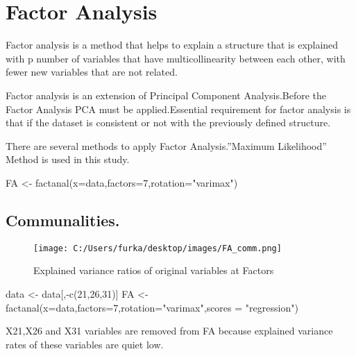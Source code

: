 \documentclass[12pt,twoside]{deuthesis}
\newenvironment{Shaded}{\begin{snugshade}}{\end{snugshade}}
\newcommand{\AttributeTok}[1]{\textcolor[rgb]{0.77,0.63,0.00}{#1}}
\newcommand{\DecValTok}[1]{\textcolor[rgb]{0.00,0.00,0.81}{#1}}
\newcommand{\FunctionTok}[1]{\textcolor[rgb]{0.00,0.00,0.00}{#1}}
\newcommand{\NormalTok}[1]{#1}
\newcommand{\OtherTok}[1]{\textcolor[rgb]{0.56,0.35,0.01}{#1}}
\newcommand{\SpecialCharTok}[1]{\textcolor[rgb]{0.00,0.00,0.00}{#1}}
\newcommand{\StringTok}[1]{\textcolor[rgb]{0.31,0.60,0.02}{#1}}
\begin{document}
\hypertarget{factor-analysis}{%
\section{Factor Analysis}\label{factor-analysis}}

Factor analysis is a method that helps to explain a structure that is explained with p number of variables that have multicollinearity between each other, with fewer new variables that are not related.\\

\setlength{\parindent}{0in}

Factor analysis is an extension of Principal Component Analysis.Before the Factor Analysis PCA must be applied.Essential requirement for factor analysis is that if the dataset is consistent or not with the previously defined structure.

\setlength{\parindent}{0in}

There are several methods to apply Factor Analysis.''Maximum Likelihood'' Method is used in this study.
\begin{Shaded}
\begin{Highlighting}[]
\NormalTok{FA }\OtherTok{\textless{}{-}} \FunctionTok{factanal}\NormalTok{(}\AttributeTok{x=}\NormalTok{data,}\AttributeTok{factors=}\DecValTok{7}\NormalTok{,}\AttributeTok{rotation=}\StringTok{"varimax"}\NormalTok{)}
\end{Highlighting}
\end{Shaded}
\hypertarget{communalities.}{%
\subsection{Communalities.}\label{communalities.}}
\begin{Shaded}
\end{Shaded}
\begin{figure}
\centering
\texttt{[image: C:/Users/furka/desktop/images/FA\_comm.png]}
\caption{Explained variance ratios of original variables at Factors}
\end{figure}
\begin{Shaded}
\begin{Highlighting}[]
\NormalTok{data }\OtherTok{\textless{}{-}}\NormalTok{ data[,}\SpecialCharTok{{-}}\FunctionTok{c}\NormalTok{(}\DecValTok{21}\NormalTok{,}\DecValTok{26}\NormalTok{,}\DecValTok{31}\NormalTok{)]}
\NormalTok{FA }\OtherTok{\textless{}{-}} \FunctionTok{factanal}\NormalTok{(}\AttributeTok{x=}\NormalTok{data,}\AttributeTok{factors=}\DecValTok{7}\NormalTok{,}\AttributeTok{rotation=}\StringTok{"varimax"}\NormalTok{,}\AttributeTok{scores =} \StringTok{"regression"}\NormalTok{)}
\end{Highlighting}
\end{Shaded}
X21,X26 and X31 variables are removed from FA because explained variance rates of these variables are quiet low.
\end{document}
